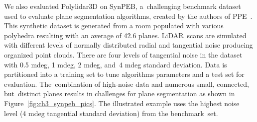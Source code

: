 We also evaluated Polylidar3D on SynPEB, a~challenging benchmark dataset used to evaluate plane segmentation algorithms, created by the authors of PPE~\cite{schaefer_maximum_2019}. This synthetic dataset is generated from a room populated with various polyhedra resulting with an average of 42.6 planes. LiDAR~scans are simulated with different levels of normally distributed radial and tangential noise producing organized point clouds. There are four levels of tangential noise in the dataset with 0.5 mdeg, 1 mdeg, 2 mdeg, and~4 mdeg standard deviation.  Data is partitioned into a training set to tune algorithms parameters and a test set for evaluation. The~combination of high-noise data and numerous small, connected, but~distinct planes results in challenges for plane segmentation as shown in Figure~\ref{fig:ch3_synpeb_pics}. 
The illustrated example uses the highest noise level (4 mdeg tangential standard deviation) from the benchmark~set.



